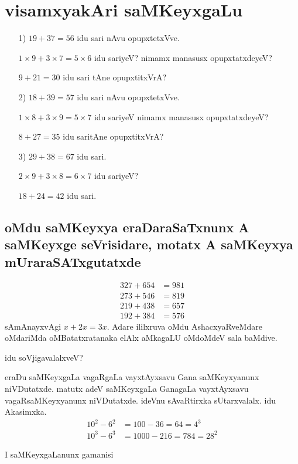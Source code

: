 \chapter{visamxyakAri saMKeyxgaLu}

\begin{itemize}
\item[{\rm 1)}] $19+37 = 56$ idu sari nAvu opupxtetxVve.

$1 \times 9+3 \times 7 = 5 \times 6 $ idu sariyeV? nimamx manasusx opupxtatxdeyeV?

$9+21 =30$ idu sari tAne opupxtitxVrA?

\item[{\rm 2)}] $18+39 = 57$ idu sari nAvu opupxtetxVve.

$1 \times 8+3 \times 9 = 5 \times 7 $  idu sariyeV nimamx manasusx opupxtatxdeyeV?

$8 + 27 = 35$ idu saritAne opupxtitxVrA?

\item[{\rm 3)}] $29 + 38 = 67$ idu sari.

$2\times 9 + 3 \times 8 = 6 \times 7$ idu sariyeV?

$18+24 = 42$ idu sari.
\end{itemize}

\section*{oMdu saMKeyxya eraDaraSaTxnunx A saMKeyxge seVrisidare, motatx A saMKeyxya mUraraSATxgutatxde}
\begin{align*}
327+654 &= 981\\
273+546 &= 819\\
219+438 &= 657\\
192+384 &= 576
\end{align*}
sAmAnayxvAgi $x+2x=3x$. Adare ililxruva oMdu AshacxyaRveMdare oMdariMda oMBatatxratanaka elAlx aMkagaLU oMdoMdeV sala baMdive.

idu soVjigavalalxveV?

eraDu saMKeyxgaLa vagaRgaLa vayxtAyxsavu Gana saMKeyxyanunx niVDutatxde. matutx adeV saMKeyxgaLa GanagaLa vayxtAyxsavu vagaRsaMKeyxyanunx niVDutatxde. ideVnu sAvaRtirxka sUtarxvalalx. idu Akasimxka.
\begin{align*}
10^2-6^2 &= 100-36 = 64 = 4^3\\
10^3-6^3 &= 1000-216 = 784 = 28^2
\end{align*}

I saMKeyxgaLanunx gamanisi

